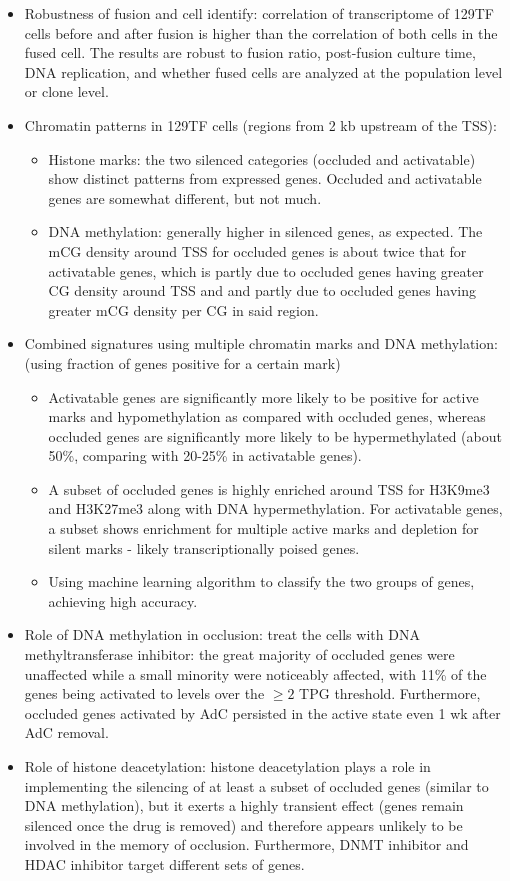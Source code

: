 \documentclass{report}
\begin{document}
\begin{itemize}
\begin{itemize}
	\end{itemize}
	\item Robustness of fusion and cell identify: correlation of transcriptome of 129TF cells before and after fusion is higher than the correlation of both cells in the fused cell. The results are robust to fusion ratio, post-fusion culture time, DNA replication, and whether fused cells are analyzed at the population level or clone level.
	\item Chromatin patterns in 129TF cells (regions from 2 kb upstream of the TSS): 
	\begin{itemize}
		\item Histone marks: the two silenced categories (occluded and activatable) show distinct patterns from expressed genes. Occluded and activatable genes are somewhat different, but not much. 
		\item DNA methylation: generally higher in silenced genes, as expected. The mCG density around TSS for occluded genes is about twice that for activatable genes,  which is partly due to occluded genes having greater CG density around TSS and and partly due to occluded genes having greater mCG density per CG in said region. 
	\end{itemize}
	\item Combined signatures using multiple chromatin marks and DNA methylation: (using fraction of genes positive for a certain mark)
	\begin{itemize}
		\item Activatable genes are significantly more likely to be positive for active marks and hypomethylation as compared with occluded genes, whereas occluded genes are significantly more likely to be hypermethylated (about 50\%, comparing with 20-25\% in activatable genes). 
		\item A subset of occluded genes is highly enriched around TSS for H3K9me3 and H3K27me3 along with DNA hypermethylation. For activatable genes, a subset shows enrichment for multiple active marks and depletion for silent marks - likely transcriptionally poised genes. 
		\item Using machine learning algorithm to classify the two groups of genes, achieving high accuracy. 
	\end{itemize}
	\item Role of DNA methylation in occlusion: treat the cells with DNA methyltransferase inhibitor: the great majority of occluded genes were unaffected while a small minority were noticeably affected, with 11\% of the genes being activated to levels over the $\geq 2$ TPG threshold. Furthermore, occluded genes activated by AdC persisted in the active state even 1 wk after AdC removal. 
	\item Role of histone deacetylation: histone deacetylation plays a role in implementing the silencing of at least a subset of occluded genes (similar to DNA methylation), but it exerts a highly transient effect (genes remain silenced once the drug is removed) and therefore appears unlikely to be involved in the memory of occlusion. Furthermore, DNMT inhibitor and HDAC inhibitor target different sets of genes.
\end{itemize}
\end{document}
